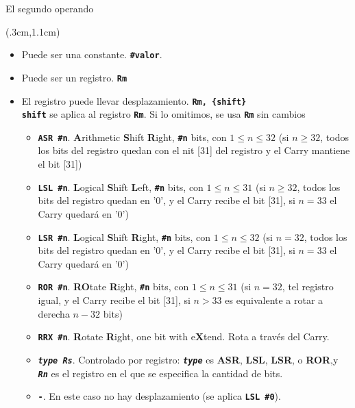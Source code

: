 \documentclass[usenames,table,dvipsnames,aspectratio=169]{beamer}
\begin{document}
\begin{frame}{El segundo operando}
 \begin{textblock*}{\textwidth}(.3cm,1.1cm) 
  \begin{itemize}[<+(1)->] \justifying
   \item Puede ser una constante. \textbf{\texttt{\#valor}}.
   \item Puede ser un registro. \textbf{\texttt{Rm}}
   \item El registro puede llevar desplazamiento. \textbf{\texttt{Rm, \{shift\}}} \\
   \texttt{\textbf{shift}} se aplica al registro \textbf{\texttt{Rm}}. Si lo omitimos, se usa \textbf{\texttt{Rm}} sin cambios
   \begin{itemize}\justifying
    \item [-] \textbf{\texttt{\color{blue}ASR \#n}}. \textbf{A}rithmetic \textbf{S}hift \textbf{R}ight, \textbf{\texttt{\#n}} bits, con $1 \leq  n \leq 32$ (si $n \geq 32$, todos los bits del registro quedan con el nit [31] del registro y el Carry mantiene el bit [31])
    \item [-] \textbf{\texttt{\color{blue}LSL \#n}}. \textbf{L}ogical \textbf{S}hift \textbf{L}eft, \textbf{\texttt{\#n}} bits, con $1 \leq  n \leq 31$ (si $n \geq 32$, todos los bits del registro quedan en '0', y el Carry recibe el bit [31], si $n = 33$ el Carry quedará en '0')
    \item [-] \textbf{\texttt{\color{blue}LSR \#n}}. \textbf{L}ogical \textbf{S}hift \textbf{R}ight, \textbf{\texttt{\#n}}    bits, con $1 \leq  n \leq 32$ (si $n=32$, todos los bits del registro quedan en '0', y el Carry recibe el bit [31], si $n =33$ el Carry quedará en '0')
    \item [-] \textbf{\texttt{\color{blue}ROR \#n}}. \textbf{RO}tate \textbf{R}ight, \textbf{\texttt{\#n}} bits, con $1 \leq  n \leq 31$ (si $n = 32$, tel registro igual, y el Carry recibe el bit [31], si $n > 33$ es equivalente a rotar a derecha $n-32$ bits)
    \item [-] \textbf{\texttt{\color{blue}RRX \#n}}. \textbf{R}otate \textbf{R}ight, one bit with e\textbf{X}tend. Rota a través del Carry.
    \item [-] \textbf{\texttt{\color{blue}\textit{type Rs}}}. Controlado por registro: \texttt{\textit{\textbf{type}}} es \textbf{ASR}, \textbf{LSL}, \textbf{LSR}, o \textbf{ROR},y \textbf{\textit{\texttt{Rn}}} es el registro en el que se especifica la cantidad de bits.
    \item [-] \textbf{\texttt{-}}. En este caso no hay desplazamiento (se aplica \textbf{\texttt{LSL \#0}}).
   \end{itemize}
  \end{itemize}
 \end{textblock*}   
\end{frame}
\end{document}
